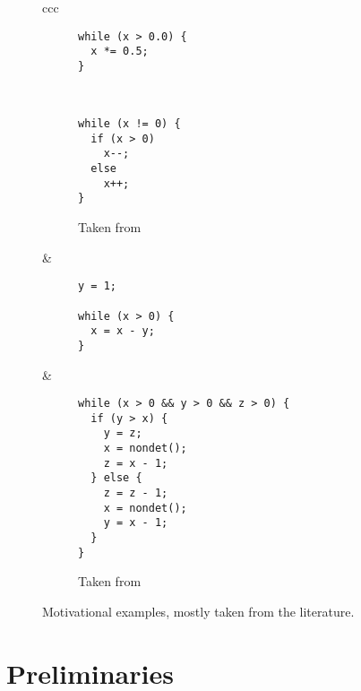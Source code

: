 \documentclass[preprint]{sigplanconf}
\theoremstyle{definition}
\begin{document}
\begin{figure*}
\begin{tabular}{ccc}
\begin{subfigure}[b]{0.3\textwidth}
\begin{lstlisting}
while (x > 0.0) {
  x *= 0.5;
}
\end{lstlisting}
\caption{}
 \label{fig:motivation.f}
\end{subfigure} \\
\hline

\begin{subfigure}[b]{0.3\textwidth}
\begin{lstlisting}
while (x != 0) {
  if (x > 0)
    x--;
  else
    x++;
}
\end{lstlisting}
\caption{Taken from \cite{DBLP:conf/tacas/CookSZ13}}
 \label{fig:motivation.g}
\end{subfigure} 


&

\begin{subfigure}[b]{0.3\textwidth}
\begin{lstlisting}
y = 1;

while (x > 0) {
  x = x - y;
}
\end{lstlisting}
\caption{}
 \label{fig:motivation.h}
\end{subfigure} 


&


\begin{subfigure}[b]{0.3\textwidth}
\begin{lstlisting}
while (x > 0 && y > 0 && z > 0) {
  if (y > x) {
    y = z;
    x = nondet();
    z = x - 1;
  } else {
    z = z - 1;
    x = nondet();
    y = x - 1;
  }
}
\end{lstlisting}
\caption{Taken from~\cite{BA:mcs}}
 \label{fig:motivation.i}
\end{subfigure} 
% 
% 
% 
% 

\end{tabular}
\caption{Motivational examples, mostly taken from the literature.\label{fig:motivation}}
\end{figure*}




\section{Preliminaries}
\end{document}
